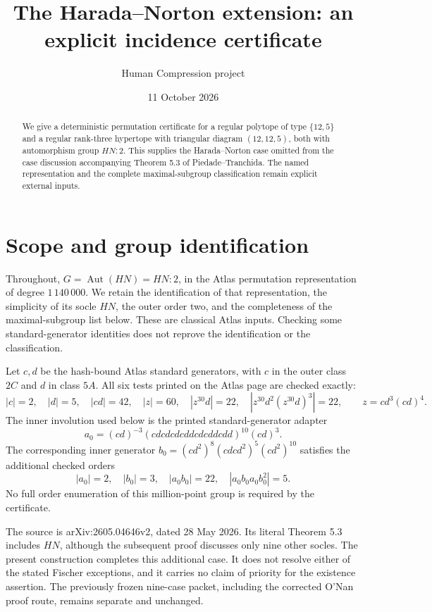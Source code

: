 \documentclass[11pt]{article}
\title{The Harada--Norton extension: an explicit incidence certificate}
\author{Human Compression project}
\date{11 October 2026}
\begin{document}
\maketitle
\begin{abstract}
We give a deterministic permutation certificate for a regular polytope of type $\{12,5\}$ and a regular rank-three hypertope with triangular diagram $(12,12,5)$, both with automorphism group $HN:2$. This supplies the Harada--Norton case omitted from the case discussion accompanying Theorem 5.3 of Piedade--Tranchida. The named representation and the complete maximal-subgroup classification remain explicit external inputs.
\end{abstract}
\section{Scope and group identification}
Throughout, $G=\operatorname{Aut}(HN)=HN:2$, in the Atlas permutation representation of degree $1\,140\,000$. We retain the identification of that representation, the simplicity of its socle $HN$, the outer order two, and the completeness of the maximal-subgroup list below. These are classical Atlas inputs. Checking some standard-generator identities does not reprove the identification or the classification.

Let $c,d$ be the hash-bound Atlas standard generators, with $c$ in the outer class $2C$ and $d$ in class $5A$. All six tests printed on the Atlas page are checked exactly:
\[
 |c|=2,\quad |d|=5,\quad |cd|=42,\quad
 |z|=60,\quad |z^{30}d|=22,\quad
 |z^{30}d^2(z^{30}d)^3|=22,
 \qquad z=cd^3(cd)^4.
\]
The inner involution used below is the printed standard-generator adapter
\[
 a_0=(cd)^{-3}(cdcdcdcddcdcddcdd)^{10}(cd)^3.
\]
The corresponding inner generator $b_0=(cd^2)^8(cdcd^2)^5(cd^2)^{10}$ satisfies the additional checked orders
\[
 |a_0|=2,\quad |b_0|=3,\quad |a_0b_0|=22,
 \quad |a_0b_0a_0b_0^2|=5.
\]
No full order enumeration of this million-point group is required by the certificate.

The source is arXiv:2605.04646v2, dated 28 May 2026. Its literal Theorem 5.3 includes $HN$, although the subsequent proof discusses only nine other socles. The present construction completes this additional case. It does not resolve either of the stated Fischer exceptions, and it carries no claim of priority for the existence assertion. The previously frozen nine-case packet, including the corrected O'Nan proof route, remains separate and unchanged.
\end{document}

